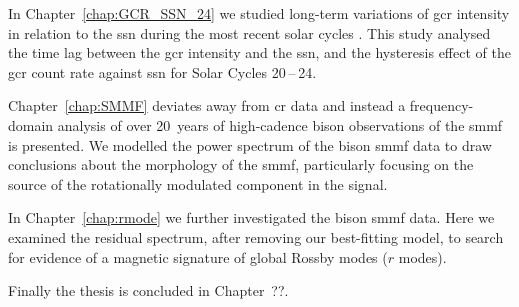 In Chapter~\ref{chap:GCR_SSN_24} we studied long-term variations of \gls{gcr} intensity in relation to the \gls{ssn} during the most recent solar cycles \citep{ross_behaviour_2019}. This study analysed the time lag between the \gls{gcr} intensity and the \gls{ssn}, and the hysteresis effect of the \gls{gcr} count rate against \gls{ssn} for Solar Cycles 20 -- 24.

Chapter~\ref{chap:SMMF} deviates away from \gls{cr} data and instead a frequency-domain analysis of over 20~years of high-cadence \gls{bison} observations of the \gls{smmf} is presented. We modelled the power spectrum of the \gls{bison} \gls{smmf} data to draw conclusions about the morphology of the \gls{smmf}, particularly focusing on the source of the rotationally modulated component in the signal.

In Chapter~\ref{chap:rmode} we further investigated the \gls{bison} \gls{smmf} data. Here we examined the residual spectrum, after removing our best-fitting model, to search for evidence of a magnetic signature of global Rossby modes ($r$ modes).

Finally the thesis is concluded in Chapter~??.